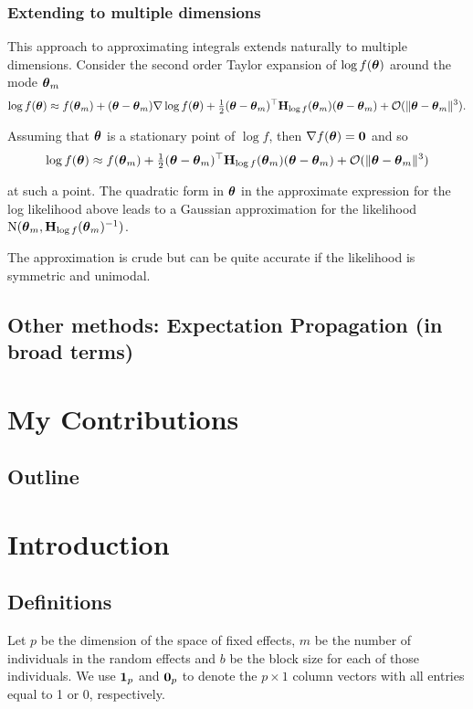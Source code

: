 \documentclass{amsart}[12pt]
\begin{document}
\subsubsection{Extending to multiple dimensions}
This approach to approximating integrals extends naturally to multiple dimensions.
Consider the second order Taylor expansion of $\log f({\boldsymbol \theta})$ around the mode ${\boldsymbol \theta}_m$
$$
\log f({\boldsymbol \theta}) \approx f({\boldsymbol \theta}_m) + ({\boldsymbol \theta} - {\boldsymbol \theta}_m) \nabla \log f({\boldsymbol \theta}) + \tfrac{1}{2} ({\boldsymbol \theta} - {\boldsymbol \theta}_m)^\top {\bf H}_{\log f}({\boldsymbol \theta}_m) ({\boldsymbol \theta} - {\boldsymbol \theta}_m) + {\mathcal O}(\|{\boldsymbol \theta} - {\boldsymbol \theta}_m\|^3).
$$

Assuming that ${\boldsymbol \theta}$ is a stationary point of $\log f$, then $\nabla f({\boldsymbol \theta}) = {\bf 0}$ and so
$$
\log f({\boldsymbol \theta}) \approx f({\boldsymbol \theta}_m) + \tfrac{1}{2} ({\boldsymbol \theta} - {\boldsymbol \theta}_m)^\top {\bf H}_{\log f}({\boldsymbol \theta}_m) ({\boldsymbol \theta} - {\boldsymbol \theta}_m) + {\mathcal O}(\|{\boldsymbol \theta} - {\boldsymbol \theta}_m\|^3)
$$

at such a point. The quadratic form in ${\boldsymbol \theta}$ in the approximate expression for the log likelihood above
leads to a Gaussian approximation for the likelihood $\text{N}({\boldsymbol \theta}_m, {\bf H}_{\log f}({\boldsymbol \theta}_m)^{-1})$.

The approximation is crude but can be quite accurate if the likelihood is symmetric and unimodal.
\subsection{Other methods: Expectation Propagation (in broad terms)}
\section{My Contributions}
\subsection{Outline}

\section{Introduction}


\subsection{Definitions}

Let $p$ be the dimension of the space of fixed effects, $m$ be the number of individuals in the random effects
and $b$ be the block size for each of those individuals. We use ${\bf 1}_p$ and ${\bf 0}_p$ to denote the $p
\times 1$ column vectors with all entries equal to 1 or 0, respectively.
\end{document}
